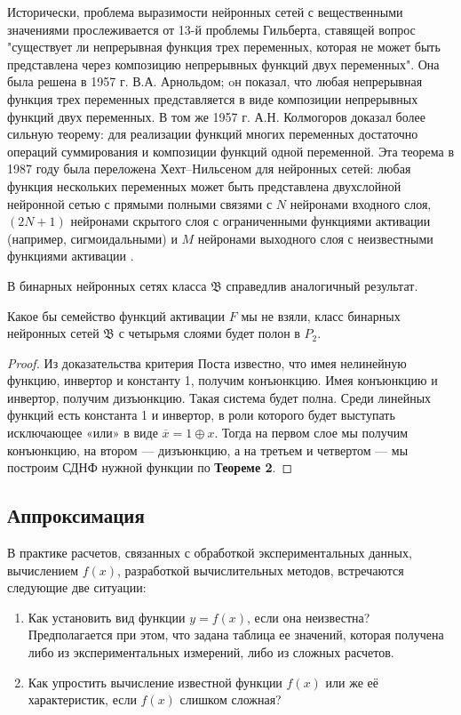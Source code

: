     Исторически, проблема выразимости нейронных сетей с вещественными значениями прослеживается от 13-й проблемы Гильберта, ставящей вопрос "существует ли непрерывная функция трех переменных, которая не может быть представлена через композицию непрерывных функций двух переменных". Она была решена в 1957 г. В.А. Арнольдом; oн показал, что любая непрерывная функция трех переменных представляется в виде композиции непрерывных функций двух переменных. В том же 1957 г. А.Н. Колмогоров доказал более сильную теорему: для реализации функций многих переменных достаточно операций суммирования и композиции функций одной переменной. Эта теорема в 1987 году была переложена Хехт–Нильсеном для нейронных сетей: любая функция нескольких переменных может быть представлена двухслойной нейронной сетью с прямыми полными связями с $N$ нейронами входного слоя, $(2N+1)$ нейронами скрытого слоя с ограниченными  функциями активации (например, сигмоидальными) и $M$ нейронами выходного слоя с неизвестными функциями активации \cite{seventh, eighth, ninth, tenth}.
    
    В бинарных нейронных сетях класса $\mathfrak{B}$ справедлив аналогичный результат.
    
    \begin{theorem}
    Какое бы семейство функций активации $F$ мы не взяли, класс бинарных нейронных сетей $\mathfrak{B}$ с четырьмя слоями будет полон в $P_2$.
    \end{theorem}
    
    \begin{proof}
    Из доказательства критерия Поста \cite{eleventh} известно, что имея нелинейную функцию, инвертор и константу 1, получим конъюнкцию. Имея конъюнкцию и инвертор, получим дизъюнкцию. Такая система будет полна. Среди линейных функций есть константа 1 и инвертор, в роли которого будет выступать исключающее «или» в виде $\overline{x} = 1 \oplus x$. Тогда на первом слое мы получим конъюнкцию, на втором — дизъюнкцию, а на третьем и четвертом — мы построим СДНФ нужной функции по \textbf{Теореме 2}.
    \end{proof}
    
    
\subsection{Аппроксимация}   
    В практике расчетов, связанных с обработкой экспериментальных данных, вычислением $f(x)$, разработкой вычислительных методов, встречаются следующие две ситуации:
    
    \begin{enumerate}
    \item Как установить вид функции $y = f(x)$, если она неизвестна? Предполагается при этом, что задана таблица ее значений, которая получена либо из экспериментальных измерений, либо из сложных расчетов.
    \item Как упростить вычисление известной функции $f(x)$ или же её характеристик, если $f(x)$ слишком сложная?
    \end{enumerate}
    
